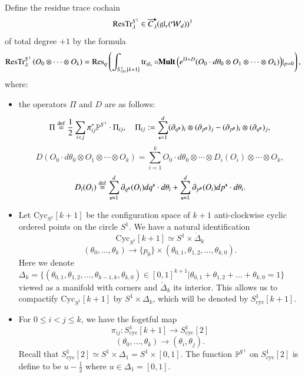 \documentclass[main.tex]{subfiles}
\begin{document}
\begin{definition}
    Define the residue trace cochain
    \[
      \operatorname{ResTr}^{S^1}_\lambda \in  \overline{C}_{\lambda}^{\bullet}(\mathfrak{gl}_r(\mathcal{W}_d))^1
  \]
   of total degree $+1$ by the formula
\begin{multline}
  \mathrm{ResTr}_\lambda^{S^1}\left(O_0\otimes \cdots\otimes O_k\right) =
  \mathrm{Res}_{q} \left({\int_{S^1_{\mathrm{cyc}}[k+1]}\operatorname{tr}_{\mathfrak{gl}_r}\circ\mathbf{Mult}\left(e^{\Pi+D}(O_0\cdot d\theta_0\otimes O_1\otimes\cdots\otimes O_k)\right)}|_{p=0}\right),
\end{multline}
    where:
    \begin{itemize}
    \item[(i)] the operators $\Pi$ and $D$ are as follows:
      \[
\Pi\overset{\rm def}{=} \frac{1}{2}\sum_{i<j}\pi^*_{ij}\mathbb{P}^{S^1}\cdot \Pi_{ij},\quad \Pi_{ij}:=\sum^d_{\textbf{\texttt{\tiny{s}}}=1}(\partial_{q^{\textbf{\texttt{\tiny{s}}}}})_i\otimes(\partial_{p^{\textbf{\texttt{\tiny{s}}}}})_j-(\partial_{p^{\textbf{\texttt{\tiny{s}}}}})_i\otimes(\partial_{q^{\textbf{\texttt{\tiny{s}}}}})_j,
\]
\[
D(O_0\cdot d\theta_0\otimes O_1\otimes\cdots\otimes O_k)=\sum^{k}_{i=1}O_0\cdot d\theta_0\otimes \cdots\otimes D_i(O_i)\otimes\cdots\otimes O_k,
\]
    \[
    D_i(O_i)\overset{\rm def}{=} \sum^d_{\textbf{\texttt{\tiny{s}}}=1}{\partial_{q^{\textbf{\texttt{\tiny{s}}}}}}(O_i)dq^{\textbf{\texttt{\tiny{s}}}}\cdot d\theta_i+\sum^d_{\textbf{\texttt{\tiny{s}}}=1}{\partial_{p^{\textbf{\texttt{\tiny{s}}}}}}(O_i)dp^{\textbf{\texttt{\tiny{s}}}}\cdot d\theta_i.
  \]
      \item[(ii)] Let $\mathrm{Cyc}_{S^1}[k+1]$ be the configuration space of $k+1$ anti-clockwise cyclic ordered points on the circle $S^1$. We have a natural identification
      \[
      \mathrm{Cyc}_{S^1}[k+1]\simeq S^1\times \mathring{\Delta}_{k}
      \]
      \[
      (\theta_0,\dots,\theta_k)\rightarrow \{p_0\}\times (\theta_{0,1},\theta_{1,2},\dots,\theta_{k,0}).
      \]
      Here we denote $\Delta_k=\{(\theta_{0,1},\theta_{1,2},\dots,\theta_{k-1,k},\theta_{k,0})\in [0,1]^{k+1}| \theta_{0,1}+\theta_{1,2}+\dots+\theta_{k,0}=1\}$ viewed as a manifold with corners and $\mathring{\Delta}_{k}$ its interior. This allows us to compactify $\mathrm{Cyc}_{S^1}[k+1]$ by $S^1\times\Delta_{k}$, which will be denoted by $S^1_{\mathrm{cyc}}[k+1]$.  
      \item[(iii)] For $0\leq i<j\leq k$, we have the fogetful map
      \[
\pi_{ij}:      S^1_{\mathrm{cyc}}[k+1]\rightarrow       S^1_{\mathrm{cyc}}[2]
      \]
      \[
      (\theta_0,\dots,\theta_k)\rightarrow (\theta_i,\theta_j).
      \]
    Recall  that $S^1_{\mathrm{cyc}}[2]\simeq S^1\times \Delta_1=S^1\times [0,1]$. The function $\mathbb{P}^{S^1}$ on $S^1_{\mathrm{cyc}}[2]$ is define to be $u-\frac{1}{2}$ where $u\in \Delta_1=[0,1]$.
    

\end{itemize}
\end{definition}
\end{document}
